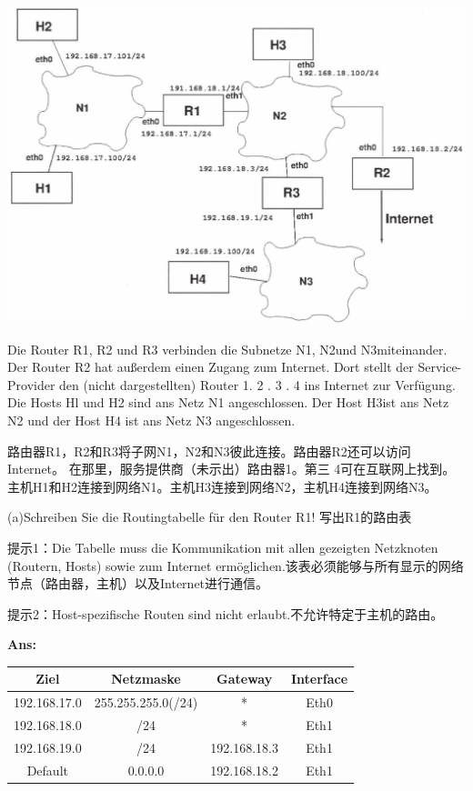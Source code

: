 \documentclass[fleqn]{article}
\begin{document}
\begin{center}
    \includegraphics[]{bild2.png}
\end{center}

Die Router R1, R2 und R3 verbinden die Subnetze N1, N2und N3miteinander. Der Router R2 hat außerdem einen Zugang zum Internet. 
Dort stellt der Service-Provider den (nicht dargestellten) Router 1. 2 . 3 . 4 ins Internet zur Verfügung.
Die Hosts Hl und H2 sind ans Netz N1 angeschlossen. Der Host H3ist ans Netz N2 und der Host H4 ist ans Netz N3 angeschlossen.

路由器R1，R2和R3将子网N1，N2和N3彼此连接。路由器R2还可以访问Internet。
在那里，服务提供商（未示出）路由器1。第三 4可在互联网上找到。
主机H1和H2连接到网络N1。主机H3连接到网络N2，主机H4连接到网络N3。

(a)Schreiben Sie die Routingtabelle für den Router R1! 写出R1的路由表

提示1：Die Tabelle muss die Kommunikation mit allen gezeigten Netzknoten (Routern, Hosts) sowie zum Internet ermöglichen.该表必须能够与所有显示的网络节点（路由器，主机）以及Internet进行通信。

提示2：Host-spezifische Routen sind nicht erlaubt.不允许特定于主机的路由。

\textbf{Ans:}

\begin{tabular}{|c|c|c|c|}
    \hline
    Ziel&Netzmaske&Gateway&Interface\\
    \hline
    192.168.17.0&255.255.255.0(/24)&*&Eth0\\
    \hline
    192.168.18.0&/24&*&Eth1\\
    \hline
    192.168.19.0&/24&192.168.18.3&Eth1\\
    \hline
    Default&0.0.0.0&192.168.18.2&Eth1\\
    \hline
\end{tabular}
\end{document}
